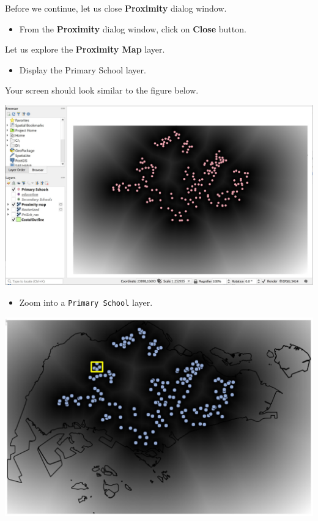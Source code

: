 \documentclass[
  letterpaper,
  DIV=11,
  numbers=noendperiod]{scrreprt}
\providecommand{\tightlist}{%
  \setlength{\itemsep}{0pt}\setlength{\parskip}{0pt}}\usepackage{longtable,booktabs,array}
\begin{document}
Before we continue, let us close \textbf{Proximity} dialog window.

\begin{itemize}
\tightlist
\item
  From the \textbf{Proximity} dialog window, click on \textbf{Close}
  button.
\end{itemize}

Let us explore the \textbf{Proximity Map} layer.

\begin{itemize}
\tightlist
\item
  Display the Primary School layer.
\end{itemize}

Your screen should look similar to the figure below.

\includegraphics{./img06/image15.jpg}

\begin{itemize}
\tightlist
\item
  Zoom into a \texttt{Primary\ School} layer.
\end{itemize}

\includegraphics{./img06/image16.jpg}
\end{document}
